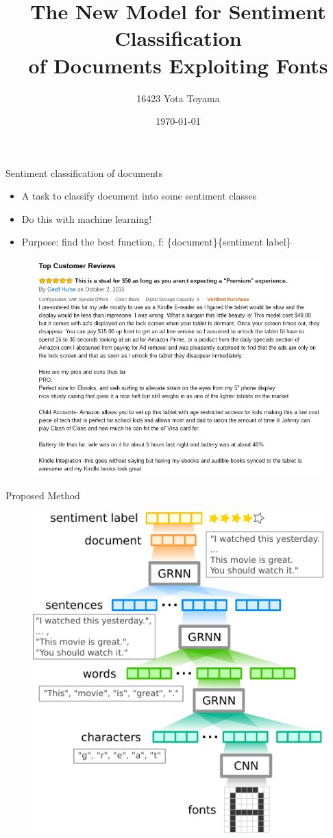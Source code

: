 \documentclass[aspectratio=43,unicode,10pt]{beamer}
\title[font2char2word2sent2doc]{
  The New Model for Sentiment Classification \\
  of Documents Exploiting Fonts}
\institute[CoIn Lab., TTI]{Computational Intelligence Laboratory, \\
                      Toyota Technological Institute}
\author{16423 Yota Toyama}
\date{\today}
\newcommand{\set}[1]{\{#1\}}
\begin{document}
\begin{frame}
\titlepage
\end{frame}

\begin{frame}{Sentiment classification of documents}
  \begin{itemize}
    \item A task to classify document into some sentiment classes
    \item Do this with machine learning!
    \item Purpose: find the best function,
          f: \set{document}\rightarrow\set{sentiment label}
  \end{itemize}
  \begin{figure}
    \includegraphics[width=0.7\linewidth]{fig/review.png}
  \end{figure}
\end{frame}

\begin{frame}{Proposed Method}
  \begin{figure}
    \includegraphics[width=0.6\linewidth]{fig/fcwsd.pdf}
  \end{figure}
\end{frame}
\end{document}
